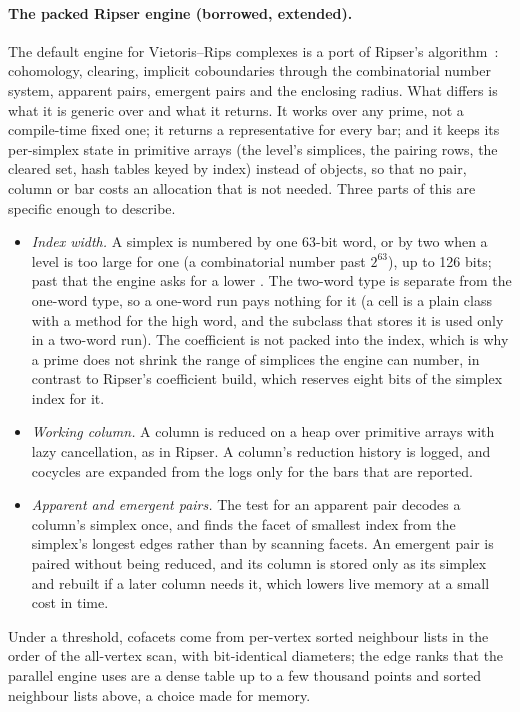 \paragraph{The packed Ripser engine (borrowed, extended).}
The default engine for Vietoris--Rips complexes is a port of Ripser's algorithm~\cite{bauer2021ripser}: cohomology, clearing,
implicit coboundaries through the combinatorial number system, apparent pairs, emergent pairs and the enclosing radius. What
differs is what it is generic over and what it returns. It works over any prime, not a compile-time fixed one; it returns a
representative for every bar; and it keeps its per-simplex state in primitive arrays (the level's simplices, the pairing
rows, the cleared set, hash tables keyed by index) instead of objects, so that no pair, column or bar costs an allocation
that is not needed. Three parts of this are specific enough to describe.
\begin{itemize}[leftmargin=1.5em, itemsep=2pt]
\item \emph{Index width.} A simplex is numbered by one 63-bit word, or by two when a level is too large for one
  (a combinatorial number past $2^{63}$), up to 126 bits; past that the engine asks for a lower . The two-word
  type is separate from the one-word type, so a one-word run pays nothing for it (a cell is a plain class with a method
  for the high word, and the subclass that stores it is used only in a two-word run). The coefficient is not packed into the
  index, which is why a prime does not shrink the range of simplices the engine can number, in contrast to Ripser's coefficient
  build, which reserves eight bits of the simplex index for it.
\item \emph{Working column.} A column is reduced on a heap over primitive arrays with lazy cancellation, as in Ripser. A
  column's reduction history is logged, and cocycles are expanded from the logs only for the bars that are reported.
\item \emph{Apparent and emergent pairs.} The test for an apparent pair decodes a column's simplex once, and finds the
  facet of smallest index from the simplex's longest edges rather than by scanning facets. An emergent pair is
  paired without being reduced, and its column is stored only as its simplex and rebuilt if a later column needs it, which
  lowers live memory at a small cost in time.
\end{itemize}
Under a threshold, cofacets come from per-vertex sorted neighbour lists in the order of the all-vertex scan, with bit-identical diameters; the
edge ranks that the parallel engine uses are a dense table up to a few thousand points and sorted neighbour lists above, a
choice made for memory.

